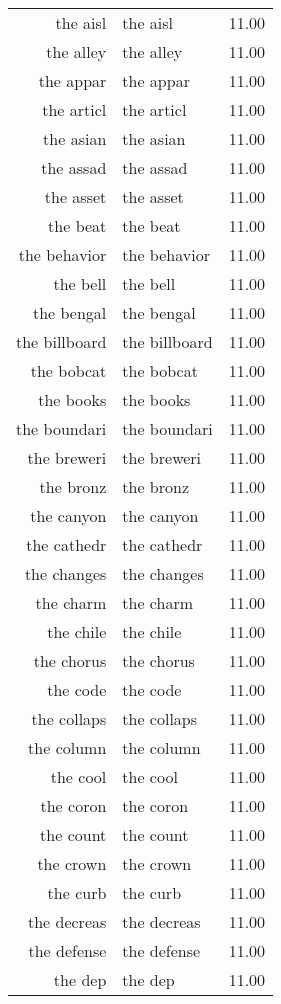 \begin{table}[ht]
\begin{tabular}{rlr}
  the aisl & the aisl & 11.00 \\ 
  the alley & the alley & 11.00 \\ 
  the appar & the appar & 11.00 \\ 
  the articl & the articl & 11.00 \\ 
  the asian & the asian & 11.00 \\ 
  the assad & the assad & 11.00 \\ 
  the asset & the asset & 11.00 \\ 
  the beat & the beat & 11.00 \\ 
  the behavior & the behavior & 11.00 \\ 
  the bell & the bell & 11.00 \\ 
  the bengal & the bengal & 11.00 \\ 
  the billboard & the billboard & 11.00 \\ 
  the bobcat & the bobcat & 11.00 \\ 
  the books & the books & 11.00 \\ 
  the boundari & the boundari & 11.00 \\ 
  the breweri & the breweri & 11.00 \\ 
  the bronz & the bronz & 11.00 \\ 
  the canyon & the canyon & 11.00 \\ 
  the cathedr & the cathedr & 11.00 \\ 
  the changes & the changes & 11.00 \\ 
  the charm & the charm & 11.00 \\ 
  the chile & the chile & 11.00 \\ 
  the chorus & the chorus & 11.00 \\ 
  the code & the code & 11.00 \\ 
  the collaps & the collaps & 11.00 \\ 
  the column & the column & 11.00 \\ 
  the cool & the cool & 11.00 \\ 
  the coron & the coron & 11.00 \\ 
  the count & the count & 11.00 \\ 
  the crown & the crown & 11.00 \\ 
  the curb & the curb & 11.00 \\ 
  the decreas & the decreas & 11.00 \\ 
  the defense & the defense & 11.00 \\ 
  the dep & the dep & 11.00 \\ 

\end{tabular}
\end{table}
